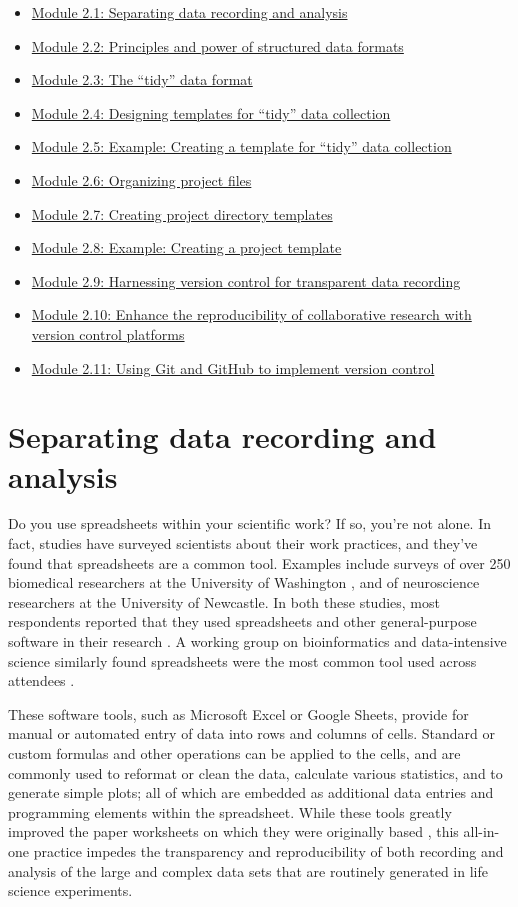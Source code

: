 \documentclass[]{tufte-book}
\providecommand{\tightlist}{%
  \setlength{\itemsep}{0pt}\setlength{\parskip}{0pt}}
\begin{document}
\begin{itemize}
\tightlist
\item
  \hyperref[module1]{Module 2.1: Separating data recording and analysis}
\item
  \hyperref[module2]{Module 2.2: Principles and power of structured data formats}
\item
  \hyperref[module3]{Module 2.3: The ``tidy'' data format}
\item
  \hyperref[module4]{Module 2.4: Designing templates for ``tidy'' data collection}
\item
  \hyperref[module5]{Module 2.5: Example: Creating a template for ``tidy'' data collection}
\item
  \hyperref[module6]{Module 2.6: Organizing project files}
\item
  \hyperref[module7]{Module 2.7: Creating project directory templates}
\item
  \hyperref[module8]{Module 2.8: Example: Creating a project template}
\item
  \hyperref[module9]{Module 2.9: Harnessing version control for transparent data recording}
\item
  \hyperref[module10]{Module 2.10: Enhance the reproducibility of collaborative research with version control platforms}
\item
  \hyperref[module11]{Module 2.11: Using Git and GitHub to implement version control}
\end{itemize}

\section{Separating data recording and analysis}\label{module1}

Do you use spreadsheets within your scientific work? If so, you're not alone. In
fact, studies have surveyed scientists about their work practices, and they've
found that spreadsheets are a common tool. Examples include surveys of over 250
biomedical researchers at the University of Washington \citep{anderson2007issues},
and of neuroscience researchers at the University of Newcastle. In both these
studies, most respondents reported that they used spreadsheets and other
general-purpose software in their research \citep{altarawneh2017pilot}. A working
group on bioinformatics and data-intensive science similarly found spreadsheets
were the most common tool used across attendees \citep{barga2011bioinformatics}.

These software tools, such as Microsoft Excel or Google Sheets, provide for
manual or automated entry of data into rows and columns of cells. Standard or
custom formulas and other operations can be applied to the cells, and are
commonly used to reformat or clean the data, calculate various statistics, and
to generate simple plots; all of which are embedded as additional data entries
and programming elements within the spreadsheet. While these tools greatly
improved the paper worksheets on which they were originally based
\citep{campbell2007number}, this all-in-one practice impedes the transparency and
reproducibility of both recording and analysis of the large and complex data
sets that are routinely generated in life science experiments.
\end{document}
